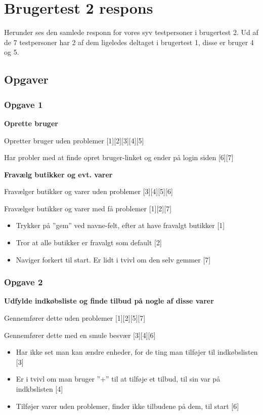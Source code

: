 \chapter{Brugertest 2 respons}\label{b:brugertestrespons2}
Herunder ses den samlede responn for vores syv testpersoner i brugertest 2.
Ud af de 7 testpersoner har 2 af dem ligeledes deltaget i brugertest 1, disse er bruger 4 og 5.

\section{Opgaver}
\subsection{Opgave 1}
\textbf{Oprette bruger}

Opretter bruger uden problemer [1][2][3][4][5]

Har probler med at finde opret bruger-linket og ender på login siden [6][7]

\textbf{Fravælg butikker og evt. varer}

Fravælger butikker og varer uden problemer [3][4][5][6]

Fravælger butikker og varer med få problemer [1][2][7]
\begin{itemize}
	\item Trykker på ''gem'' ved navne-felt, efter at have fravalgt butikker [1]
	\item Tror at alle butikker er fravalgt som default [2]
	\item Naviger forkert til start. Er lidt i tvivl om den selv gemmer [7]
\end{itemize}

\subsection{Opgave 2}
\textbf{Udfylde indkøbsliste og finde tilbud på nogle af disse varer}

Gennemfører dette uden problemer [1][2][5][7]

Gennemfører dette med en smule besvær [3][4][6]
\begin{itemize}
	\item Har ikke set man kan ændre enheder, for de ting man tilføjer til indkøbslisten [3]
	\item Er i tvivl om man bruger ''+'' til at tilføje et tilbud, til sin var på indkbslisten [4]
	\item Tilføjer varer uden problemer, finder ikke tilbudene på dem, til start [6]
\end{itemize}

